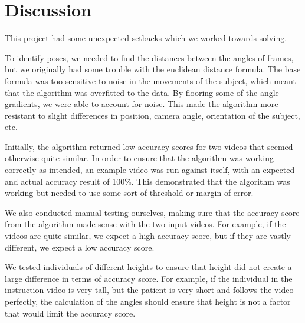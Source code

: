 \section{Discussion}
\label{sec:discussion}

\indent This project had some unexpected setbacks which we worked towards solving. 

\indent To identify poses, we needed to find the distances between the angles of frames, 
but we originally had some trouble with the euclidean distance formula. The base formula 
was too sensitive to noise in the movements of the subject, which meant that the algorithm 
was overfitted to the data. By flooring some of the angle gradients, we were able to account 
for noise. This made the algorithm more resistant to slight differences in position, camera 
angle, orientation of the subject, etc. 

\indent Initially, the algorithm returned low accuracy scores for two videos that seemed 
otherwise quite similar. In order to ensure that the algorithm was working correctly as 
intended, an example video was run against itself, with an expected and actual accuracy 
result of 100\%. This demonstrated that the algorithm was working but needed to use some 
sort of threshold or margin of error.

\indent We also conducted manual testing ourselves, making sure that the accuracy score 
from the algorithm made sense with the two input videos. For example, if the videos are 
quite similar, we expect a high accuracy score, but if they are vastly different, 
we expect a low accuracy score.

\indent We tested individuals of different heights to ensure that height did not create 
a large difference in terms of accuracy score. For example, if the individual in the 
instruction video is very tall, but the patient is very short and follows the video perfectly, 
the calculation of the angles should ensure that height is not a factor that would limit 
the accuracy score.

